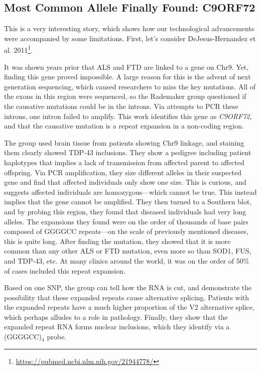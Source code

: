 \subsection*{Most Common Allele Finally Found: C9ORF72}

This is a very interesting story, which shows how our technological advancements were accompanied by some limitations. First, let's consider DeJesus-Hernandez et al. 2011\footnote{\url{https://pubmed.ncbi.nlm.nih.gov/21944778/}}.\newline

It was shown years prior that ALS and FTD are linked to a gene on Chr9. Yet, finding this gene proved impossible. A large reason for this is the advent of next generation sequencing, which caused researchers to miss the key mutations. All of the exons in this region were sequenced, so the Rademaker group questioned if the causative mutations could be in the introns. Via attempts to PCR these introns, one intron failed to amplify. This work identifies this gene as \textit{C9ORF72}, and that the causative mutation is a repeat expansion in a non-coding region.\newline

The group used brain tissue from patients showing Chr9 linkage, and staining them clearly showed TDP-43 inclusions. They show a pedigree including patient haplotypes that implies a lack of transmission from affected parent to affected offspring. Via PCR amplification, they size different alleles in their suspected gene and find that affected individuals only show one size. This is curious, and suggests affected individuals are homozygous---which cannot be true. This instead implies that the gene cannot be amplified. They then turned to a Southern blot, and by probing this region, they found that diseased individuals had very long alleles. The expansions they found were on the order of thousands of base pairs composed of GGGGCC repeats---on the scale of previously mentioned diseases, this is quite long. After finding the mutation, they showed that it is more common than any other ALS or FTD mutation, even more so than SOD1, FUS, and TDP-43, etc. At many clinics around the world, it was on the order of 50\% of cases included this repeat expansion.\newline

Based on one SNP, the group can tell how the RNA is cut, and demonstrate the possibility that these expanded repeats cause alternative splicing. Patients with the expanded repeats have a much higher proportion of the V2 alternative splice, which perhaps alludes to a role in pathology. Finally, they show that the expanded repeat RNA forms nuclear inclusions, which they identify via a (GGGGCC)$_4$ probe.\newline 


